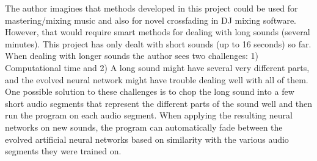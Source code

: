 The author imagines that methods developed in this project could be used for mastering/mixing music and also for novel crossfading in DJ mixing software. However, that would require smart methods for dealing with long sounds (several minutes). This project has only dealt with short sounds (up to 16 seconds) so far. When dealing with longer sounds the author sees two challenges: 1) Computational time and 2) A long sound might have several very different parts, and the evolved neural network might have trouble dealing well with all of them. One possible solution to these challenges is to chop the long sound into a few short audio segments that represent the different parts of the sound well and then run the program on each audio segment. When applying the resulting neural networks on new sounds, the program can automatically fade between the evolved artificial neural networks based on similarity with the various audio segments they were trained on.
